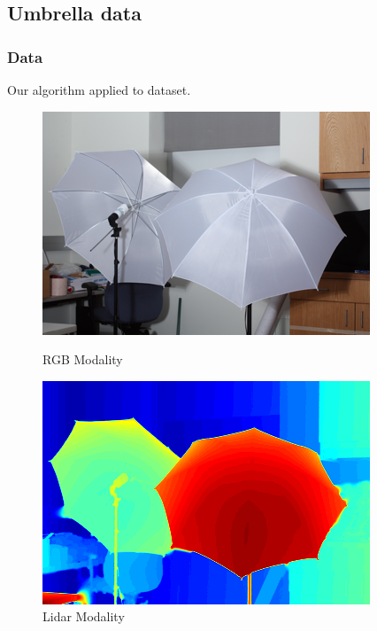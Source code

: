 \documentclass{beamer}
\begin{document}
\subsection{Umbrella data}
\begin{frame}
  \frametitle{Data}
  Our algorithm applied to \cite{Scharstein2014} dataset.
  \begin{figure}[ht]
    \begin{minipage}[b]{0.45\linewidth}
      \centering
      \includegraphics[width=\textwidth]{./Images/Umbrella/optical.png}
      \caption{RGB Modality}
    \end{minipage}
    \begin{minipage}[b]{0.45\linewidth}
      \centering
      \includegraphics[width=\textwidth]{./Images/Umbrella/lidarColor.png}
      \caption{Lidar Modality}
    \end{minipage}
  \end{figure}
\end{frame}
\end{document}
